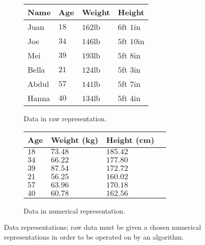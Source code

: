 \begin{figure}
    \centering
    \begin{subfigure}{0.49\textwidth}
        \centering
        \begin{tabular}{llll}\toprule
        Name   & Age  & Weight  & Height \\ \midrule
        Juan   & $18$ & $162$lb & $6$ft $1$in \\
        Joe    & $34$ & $146$lb & $5$ft $10$in \\
        Mei    & $39$ & $193$lb & $5$ft $8$in \\
        Bella  & $21$ & $124$lb & $5$ft $3$in \\
        Abdul  & $57$ & $141$lb & $5$ft $7$in \\
        Hanna  & $40$ & $134$lb & $5$ft $4$in \\ \bottomrule
        \end{tabular}
        \caption{Data in raw representation.}
        \label{fig:data represented by vectors a}
    \end{subfigure}
    \begin{subfigure}{0.5\textwidth}
        \centering
        \begin{tabular}{llll}\toprule
        Age  & Weight (kg) & Height (cm) \\ \midrule
        $18$ & $73.48$ & $185.42$ \\
        $34$ & $66.22$ & $177.80$ \\
        $39$ & $87.54$ & $172.72$ \\
        $21$ & $56.25$ & $160.02$ \\
        $57$ & $63.96$ & $170.18$ \\
        $40$ & $60.78$ & $162.56$ \\ \bottomrule
        \end{tabular}
        \caption{Data in numerical representation.}
        \label{fig:data represented by vectors b}
    \end{subfigure}
    \caption{Data representations; raw data must be given a chosen numerical representations in order to be operated on by an algorithm.}
    \label{fig:data represented by vectors}
\end{figure}

